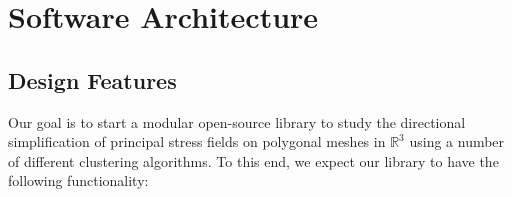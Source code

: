 \documentclass[11pt]{article}
\begin{document}

\section{Software Architecture}

\subsection{Design Features}
Our goal is to start a modular open-source library to study the directional simplification of principal stress fields on polygonal meshes in $\mathbb{R}^3$ using a number of different clustering algorithms. To this end, we expect our library to have the following functionality: 
\end{document}
